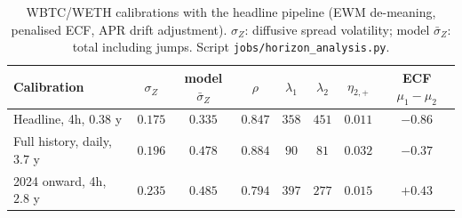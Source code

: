 \documentclass[11pt]{article}
\theoremstyle{plain}
\theoremstyle{definition}
\theoremstyle{remark}
\begin{document}
\begin{table}[ht]
\centering\small
\begin{tabular}{lccccccc}
\toprule
Calibration & $\sigma_Z$ & model $\bar\sigma_Z$ & $\rho$ & $\lambda_1$ & $\lambda_2$ & $\eta_{2,+}$ & ECF $\mu_1-\mu_2$ \\
\midrule
Headline, 4h, $0.38$ y & $0.175$ & $0.335$ & $0.847$ & $358$ & $451$ & $0.011$ & $-0.86$ \\
Full history, daily, $3.7$ y & $0.196$ & $0.478$ & $0.884$ & $90$ & $81$ & $0.032$ & $-0.37$ \\
2024 onward, 4h, $2.8$ y & $0.235$ & $0.485$ & $0.794$ & $397$ & $277$ & $0.015$ & $+0.43$ \\
\bottomrule
\end{tabular}
\caption{WBTC/WETH calibrations with the headline pipeline (EWM de-meaning, penalised ECF, APR
drift adjustment). $\sigma_Z$: diffusive spread volatility; model $\bar\sigma_Z$: total including
jumps. Script \texttt{jobs/horizon\_analysis.py}.}
\label{tab:fullhist}
\end{table}
\end{document}
